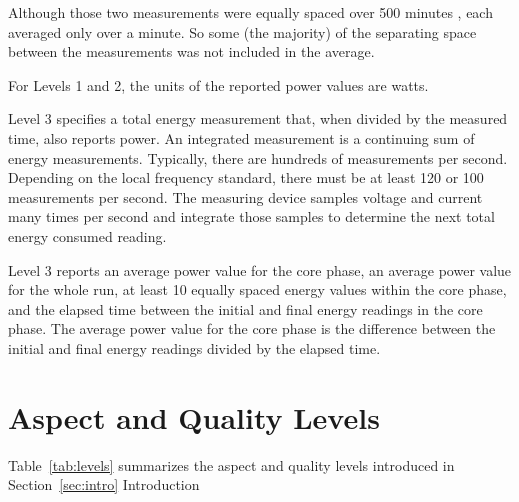 \noindent
Although those two measurements were equally spaced over 500 minutes , each averaged only over a minute. So some (the majority) of the separating space between the measurements was not included in the average. 
\wl

\noindent
For Levels 1 and 2, the units of the reported power values are watts.
\wl

\noindent
Level 3 specifies a total energy measurement that, when divided by the measured time, also reports power. An integrated measurement is a continuing sum of energy measurements. Typically, there are hundreds of measurements per second.  Depending on the local frequency standard, there must be at least 120 or 100 measurements per second. The measuring device samples voltage and current many times per second and integrate those samples to determine the next total energy consumed reading. 
\wl

\noindent
Level 3 reports an average power value for the core phase, an average power value for the whole run, at least 10 equally spaced energy values within the core phase, and the elapsed time between the initial and final energy readings in the core phase. The average power value for the core phase is the difference between the initial and final energy readings divided by the elapsed time.

\section{Aspect and Quality Levels}
\label{sec:AQLevels}
\noindent
Table~\ref{tab:levels} summarizes the aspect and quality levels introduced in Section~\ref{sec:intro} Introduction


